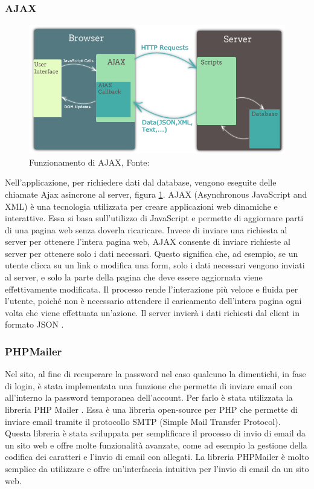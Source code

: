 \documentclass[a4paper,final,12pt]{report}
\begin{document}
\subsubsection{AJAX}
\begin{figure}[hbtp]
\centering
\includegraphics[scale=0.40]{img_concettuale/ajax.jpg}
\caption{Funzionamento di AJAX, Fonte: \cite{javascript-coder}}
\label{figura:ajaximgmessa}
\end{figure} 
Nell'applicazione, per richiedere dati dal database, vengono eseguite delle chiamate Ajax asincrone al server, figura \ref{figura:ajaximgmessa}. AJAX (Asynchronous JavaScript and XML) \cite{AJAX} è una tecnologia utilizzata per creare applicazioni web dinamiche e interattive. Essa si basa sull'utilizzo di JavaScript e permette di aggiornare parti di una pagina web senza doverla ricaricare.
Invece di inviare una richiesta al server per ottenere l'intera pagina web, AJAX consente di inviare richieste al server per ottenere solo i dati necessari. Questo significa che, ad esempio, se un utente clicca su un link o modifica una form, solo i dati necessari vengono inviati al server, e solo la parte della pagina che deve essere aggiornata viene effettivamente modificata. Il processo rende l'interazione più veloce e fluida per l'utente, poiché non è necessario attendere il caricamento dell'intera pagina ogni volta che viene effettuata un'azione.
Il server invierà i dati richiesti dal client in formato JSON \cite{JSON}.

\subsubsection{PHPMailer}
Nel sito, al fine di recuperare la password nel caso qualcuno la dimentichi, in fase di login, è stata implementata una funzione che permette di inviare email con all'interno la password temporanea dell'account. Per farlo è stata utilizzata la libreria PHP Mailer \cite{Mailer}. Essa è una libreria open-source per PHP che permette di inviare email tramite il protocollo SMTP (Simple Mail Transfer Protocol). Questa libreria è stata sviluppata per semplificare il processo di invio di email da un sito web e offre molte funzionalità avanzate, come ad esempio la gestione della codifica dei caratteri e l'invio di email con allegati. La libreria PHPMailer è molto semplice da utilizzare e offre un'interfaccia intuitiva per l'invio di email da un sito web.
\end{document}
